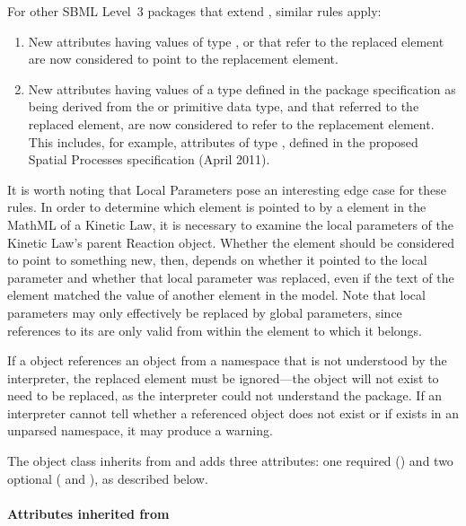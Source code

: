 For other SBML Level~3 packages that extend \sbmlthreecore, similar
rules apply:

\begin{enumerate}

\item New attributes having values of type ,
   or  that refer to the replaced
  element are now considered to point to the replacement element.

\item New attributes having values of a type defined in the package
  specification as being derived from the  or
   primitive data type, and that referred to the
  replaced element, are now considered to refer to the replacement
  element. This includes, for example, attributes of type
  , defined in the proposed Spatial Processes
  specification (April 2011).

\end{enumerate}

It is worth noting that Local Parameters pose an interesting edge case
for these rules. In order to determine which element is pointed to by a
 element in the MathML of a Kinetic Law, it is necessary to
examine the local parameters of the Kinetic Law's parent Reaction
object.  Whether the  element should be considered to point
to something new, then, depends on whether it pointed to the local
parameter and whether that local parameter was replaced, even if the
text of the element matched the  value of another element
in the model.  Note that local parameters may only effectively be
replaced by global parameters, since references to its 
are only valid from within the \Reaction element to which it belongs.

If a \ReplacedElement object references an object from a namespace that
is not understood by the interpreter, the replaced element must be
ignored---the object will not exist to need to be replaced, as the
interpreter could not understand the package.  If an interpreter cannot
tell whether a referenced object does not exist or if exists in an
unparsed namespace, it may produce a warning.

The \ReplacedElement object class inherits from \SBaseRef and adds three
attributes: one required () and two optional
( and ), as described below.


\paragraph{Attributes inherited from }

